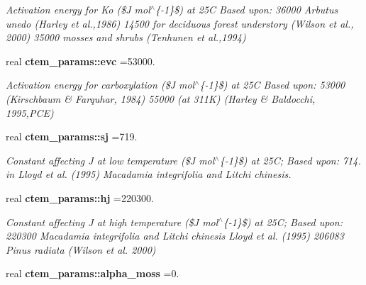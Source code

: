 \begin{DoxyCompactItemize}
\begin{DoxyCompactList}\small\item\em Activation energy for Ko (\$\+J mol$^\wedge$\{-\/1\}\$) at 25\+C Based upon\+: 36000 Arbutus unedo (Harley et al.,1986) 14500 for deciduous forest understory (Wilson et al., 2000) 35000 mosses and shrubs (Tenhunen et al.,1994) \end{DoxyCompactList}\item 
\hypertarget{namespacectem__params_a89f58555296ce18bb1ffa12e2360aadf}{}real {\bfseries ctem\+\_\+params\+::evc} =53000.\label{namespacectem__params_a89f58555296ce18bb1ffa12e2360aadf}

\begin{DoxyCompactList}\small\item\em Activation energy for carboxylation (\$\+J mol$^\wedge$\{-\/1\}\$) at 25\+C Based upon\+: 53000 (Kirschbaum \& Farquhar, 1984) 55000 (at 311\+K) (Harley \& Baldocchi, 1995,P\+C\+E) \end{DoxyCompactList}\item 
\hypertarget{namespacectem__params_a1c43450205b241741e92f1803204cb74}{}real {\bfseries ctem\+\_\+params\+::sj} =719.\label{namespacectem__params_a1c43450205b241741e92f1803204cb74}

\begin{DoxyCompactList}\small\item\em Constant affecting J at low temperature (\$\+J mol$^\wedge$\{-\/1\}\$) at 25\+C; Based upon\+: 714. in Lloyd et al. (1995) Macadamia integrifolia and Litchi chinesis. \end{DoxyCompactList}\item 
\hypertarget{namespacectem__params_aa10d8d4d4da4b27eef7ae2430a8c7ae7}{}real {\bfseries ctem\+\_\+params\+::hj} =220300.\label{namespacectem__params_aa10d8d4d4da4b27eef7ae2430a8c7ae7}

\begin{DoxyCompactList}\small\item\em Constant affecting J at high temperature (\$\+J mol$^\wedge$\{-\/1\}\$) at 25\+C; Based upon\+: 220300 Macadamia integrifolia and Litchi chinesis Lloyd et al. (1995) 206083 Pinus radiata (Wilson et al. 2000) \end{DoxyCompactList}\item 
\hypertarget{namespacectem__params_ae90073ba7316ac9a569f0a8a97dd81d9}{}real {\bfseries ctem\+\_\+params\+::alpha\+\_\+moss} =0.\label{namespacectem__params_ae90073ba7316ac9a569f0a8a97dd81d9}


\end{DoxyCompactItemize}
